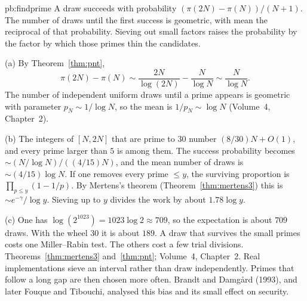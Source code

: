 \begin{solution}{pb:findprime}
\idea A draw succeeds with probability $(\pi(2N)-\pi(N))/(N+1)$. The number of draws until the first success is geometric, with mean the reciprocal of that probability. Sieving out small factors raises the probability by the factor by which those primes thin the candidates.

\writeup (a) By Theorem~\ref{thm:pnt},
\[
\pi(2N)-\pi(N)\sim\frac{2N}{\log(2N)}-\frac N{\log N}\sim\frac N{\log N}.
\]
The number of independent uniform draws until a prime appears is geometric with parameter $p_N\sim 1/\log N$, so the mean is $1/p_N\sim\log N$ (Volume~4, Chapter~2).

(b) The integers of $[N,2N]$ that are prime to $30$ number $(8/30)N+O(1)$, and every prime larger than $5$ is among them. The success probability becomes $\sim (N/\log N)/((4/15)N)$, and the mean number of draws is $\sim(4/15)\log N$. If one removes every prime $\le y$, the surviving proportion is $\prod_{p\le y}(1-1/p)$. By Mertens's theorem (Theorem~\ref{thm:mertens3}) this is $\sim e^{-\gamma}/\log y$. Sieving up to $y$ divides the work by about $1.78\log y$.

(c) One has $\log(2^{1023})=1023\log 2\approx709$, so the expectation is about $709$ draws. With the wheel $30$ it is about $189$. A draw that survives the small primes costs one Miller--Rabin test. The others cost a few trial divisions.
\tools Theorems~\ref{thm:mertens3} and~\ref{thm:pnt}; Volume~4, Chapter~2.
\leads Real implementations sieve an interval rather than draw independently. Primes that follow a long gap are then chosen more often. Brandt and Damgård (1993), and later Fouque and Tibouchi, analysed this bias and its small effect on security.
\end{solution}

